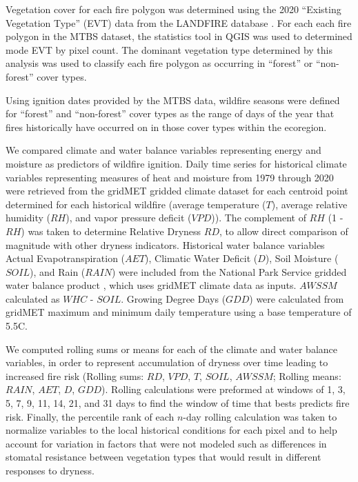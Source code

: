 \documentclass{article}
\begin{document}
Vegetation cover for each fire polygon was determined using the 2020 ``Existing Vegetation Type'' (EVT) data from the LANDFIRE database \citep{rollinsLANDFIRENationallyConsistent2009}.  For each each fire polygon in the MTBS dataset, the statistics tool in QGIS was used to determined mode EVT by pixel count.  The dominant vegetation type determined by this analysis was used to classify each fire polygon as occurring in ``forest'' or ``non-forest'' cover types.  

Using ignition dates provided by the MTBS data, wildfire seasons were defined for ``forest'' and ``non-forest'' cover types as the range of days of the year that fires historically have occurred on in those cover types within the ecoregion.

We compared climate and water balance variables representing energy and moisture as predictors of wildfire ignition.  Daily time series for historical climate variables representing measures of heat and moisture from 1979 through 2020 were retrieved from the gridMET gridded climate dataset \citep{abatzoglouDevelopmentGriddedSurface2013} for each centroid point determined for each historical wildfire (average temperature ($T$), average relative humidity ($RH$), and vapor pressure deficit ($VPD$)).  The complement of $RH$ (1 - $RH$) was taken to determine Relative Dryness $RD$, to allow direct comparison of magnitude with other dryness indicators. Historical water balance variables Actual Evapotranspiration ($AET$), Climatic Water Deficit ($D$), Soil Moisture ($SOIL$), and Rain ($RAIN$) were included from the National Park Service gridded water balance product \citep{tercekHistoricalChangesPlant2021}, which uses gridMET climate data as inputs.  $AWSSM$ calculated as $WHC$ - $SOIL$.  Growing Degree Days ($GDD$) were calculated from gridMET maximum and minimum daily temperature using a base temperature of 5.5\degree C.

We computed rolling sums or means for each of the climate and water balance variables, in order to represent accumulation of dryness over time leading to increased fire risk (Rolling sums: $RD$, $VPD$, $T$, $SOIL$, $AWSSM$; Rolling means: $RAIN$, $AET$, $D$, $GDD$).  Rolling calculations were preformed at windows of 1, 3, 5, 7, 9, 11, 14, 21, and 31 days to find the window of time that bests predicts fire risk.  Finally, the percentile rank of each $n$-day rolling calculation was taken to normalize variables to the local historical conditions for each pixel and to help account for variation in factors that were not modeled such as differences in stomatal resistance between vegetation types that would result in different responses to dryness.
\end{document}
